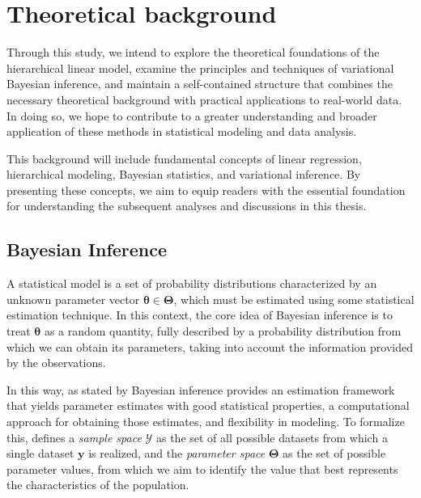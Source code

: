 \chapter{Theoretical background}

Through this study, we intend to explore the theoretical foundations of the hierarchical linear model, examine the principles and techniques of variational Bayesian inference, and maintain a self-contained structure that combines the necessary theoretical background with practical applications to real-world data. In doing so, we hope to contribute to a greater understanding and broader application of these methods in statistical modeling and data analysis.

\vspace{0.5cm}

This background will include fundamental concepts of linear regression, hierarchical modeling, Bayesian statistics, and variational inference. By presenting these concepts, we aim to equip readers with the essential foundation for understanding the subsequent analyses and discussions in this thesis.

\vspace{0.5cm}

\section{Bayesian Inference}

A statistical model is a set of probability distributions characterized by an unknown parameter vector $\bm{\theta}\in\bm{\Theta}$, which must be estimated using some statistical estimation technique. In this context, the core idea of Bayesian inference is to treat $\bm{\theta}$ as a random quantity, fully described by a probability distribution from which we can obtain its parameters, taking into account the information provided by the observations.

\vspace{0.5cm}

In this way, as stated by \cite{HOFF} Bayesian inference provides an estimation framework that yields parameter estimates with good statistical properties, a computational approach for obtaining those estimates, and flexibility in modeling. To formalize this, \cite{HOFF} defines a \textit{sample space} $\bm{\mathcal{Y}}$ as the set of all possible datasets from which a single dataset $\bm{y}$ is realized, and the \textit{parameter space} $\bm{\Theta}$ as the set of possible parameter values, from which we aim to identify the value that best represents the characteristics of the population.


